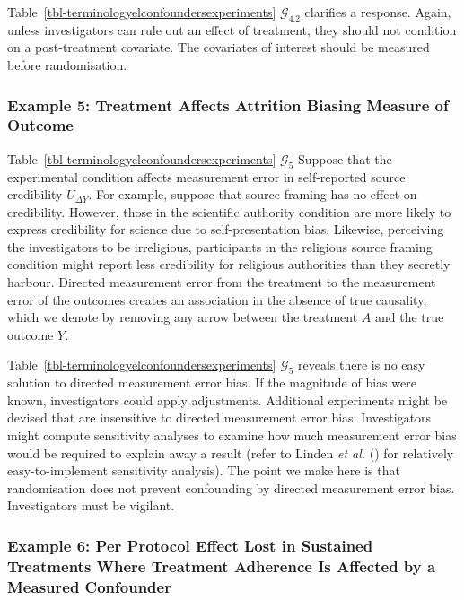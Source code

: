 \documentclass[
  single column]{article}
\begin{document}
Table~\ref{tbl-terminologyelconfoundersexperiments}
\(\mathcal{G}_{4.2}\) clarifies a response. Again, unless investigators
can rule out an effect of treatment, they should not condition on a
post-treatment covariate. The covariates of interest should be measured
before randomisation.

\subsubsection{Example 5: Treatment Affects Attrition Biasing Measure of
Outcome}\label{example-5-treatment-affects-attrition-biasing-measure-of-outcome}

Table~\ref{tbl-terminologyelconfoundersexperiments} \(\mathcal{G}_{5}\)
Suppose that the experimental condition affects measurement error in
self-reported source credibility \(U_{\Delta Y}\). For example, suppose
that source framing has no effect on credibility. However, those in the
scientific authority condition are more likely to express credibility
for science due to self-presentation bias. Likewise, perceiving the
investigators to be irreligious, participants in the religious source
framing condition might report less credibility for religious
authorities than they secretly harbour. Directed measurement error from
the treatment to the measurement error of the outcomes creates an
association in the absence of true causality, which we denote by
removing any arrow between the treatment \(A\) and the true outcome
\(Y\).

Table~\ref{tbl-terminologyelconfoundersexperiments} \(\mathcal{G}_{5}\)
reveals there is no easy solution to directed measurement error bias. If
the magnitude of bias were known, investigators could apply adjustments.
Additional experiments might be devised that are insensitive to directed
measurement error bias. Investigators might compute sensitivity analyses
to examine how much measurement error bias would be required to explain
away a result (refer to Linden \emph{et al.}
() for relatively easy-to-implement
sensitivity analysis). The point we make here is that randomisation does
not prevent confounding by directed measurement error bias.
Investigators must be vigilant.

\subsubsection{Example 6: Per Protocol Effect Lost in Sustained
Treatments Where Treatment Adherence Is Affected by a Measured
Confounder}\label{example-6-per-protocol-effect-lost-in-sustained-treatments-where-treatment-adherence-is-affected-by-a-measured-confounder}
\end{document}
